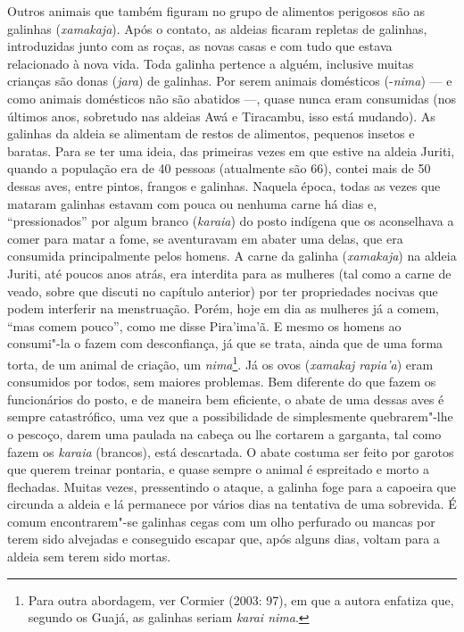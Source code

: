 Outros animais que também figuram no grupo de alimentos perigosos são as
galinhas (\emph{xamakaja}). Após o contato, as aldeias ficaram repletas
de galinhas, introduzidas junto com as roças, as novas casas e com tudo
que estava relacionado à nova vida. Toda galinha pertence a alguém,
inclusive muitas crianças são donas (\emph{jara}) de galinhas. Por serem
animais domésticos (-\emph{nima}) --- e como animais domésticos não são
abatidos ---, quase nunca eram consumidas (nos últimos anos, sobretudo nas
aldeias Awá e Tiracambu, isso está mudando). As galinhas da aldeia se
alimentam de restos de alimentos, pequenos insetos e baratas. Para se
ter uma ideia, das primeiras vezes em que estive na aldeia Juriti,
quando a população era de 40 pessoas (atualmente são 66), contei mais de
50 dessas aves, entre pintos, frangos e galinhas. Naquela época, todas
as vezes que mataram galinhas estavam com pouca ou nenhuma carne há dias
e, ``pressionados'' por algum branco (\emph{karaia}) do posto indígena que
os aconselhava a comer para matar a fome, se aventuravam em abater uma
delas, que era consumida principalmente pelos homens. A carne da galinha
(\emph{xamakaja}) na aldeia Juriti, até poucos anos atrás, era interdita
para as mulheres (tal como a carne de veado, sobre que discuti no
capítulo anterior) por ter propriedades nocivas que podem interferir na
menstruação. Porém, hoje em dia as mulheres já a comem, ``mas comem
pouco'', como me disse Pira'ima'ã. E mesmo os homens ao consumi"-la o
fazem com desconfiança, já que se trata, ainda que de uma forma torta,
de um animal de criação, um \emph{nima}\footnote{Para outra abordagem,
  ver Cormier (2003: 97), em que a autora enfatiza que, segundo os
  Guajá, as galinhas seriam \emph{karai nima}.}. Já os ovos
(\emph{xamakaj rapia'a}) eram consumidos por todos, sem maiores
problemas. Bem diferente do que fazem os funcionários do posto, e de
maneira bem eficiente, o abate de uma dessas aves é sempre catastrófico,
uma vez que a possibilidade de simplesmente quebrarem"-lhe o pescoço,
darem uma paulada na cabeça ou lhe cortarem a garganta, tal como fazem
os \emph{karaia} (brancos), está descartada. O abate costuma ser feito
por garotos que querem treinar pontaria, e quase sempre o animal é
espreitado e morto a flechadas. Muitas vezes, pressentindo o ataque, a
galinha foge para a capoeira que circunda a aldeia e lá permanece por
vários dias na tentativa de uma sobrevida. É comum encontrarem"-se
galinhas cegas com um olho perfurado ou mancas por terem sido alvejadas
e conseguido escapar que, após alguns dias, voltam para a aldeia sem
terem sido mortas.

